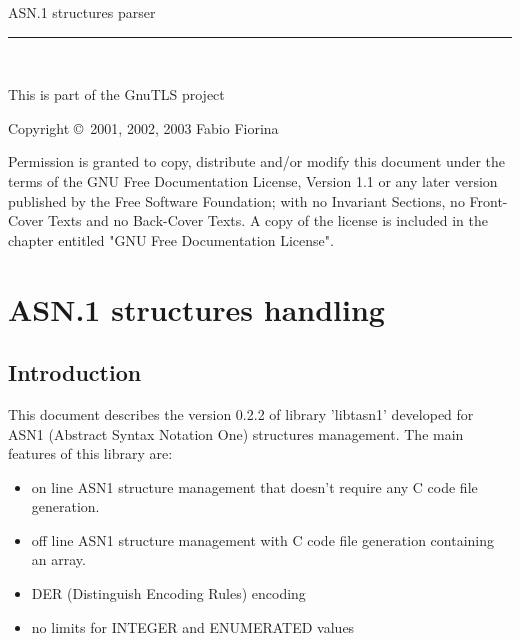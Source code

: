 \documentclass{book}
\newcommand{\HRule}{\rule{\linewidth}{0.4mm}}
\begin{document}
{\Large{ASN.1 structures parser}}
\vspace{-.3cm}
\\
\HRule
\vspace{-.6cm}
\\
\begin{flushright}
This is part of the GnuTLS project\\
\end{flushright}


\begin{center}
\par
Copyright \copyright\ 2001, 2002, 2003  Fabio Fiorina\\
\setlength{\parskip}{4mm}
\par
Permission is granted to copy, distribute and/or modify this
document under the terms of the GNU Free Documentation License,
Version 1.1 or any later version published by the Free Software
Foundation; with no Invariant Sections, no Front-Cover Texts and
no Back-Cover Texts.  A copy of the license is included in the
chapter entitled "GNU Free Documentation License".
\end{center}

\setlength{\parindent}{2mm}

\setlength{\parskip}{1mm}

\tableofcontents

\chapter{ASN.1 structures handling}

\section{Introduction}
 This document describes the version 0.2.2 of library 'libtasn1' developed
for ASN1 (Abstract Syntax Notation One) structures management.
The main features of this library are:
\begin{itemize}
\item on line ASN1 structure management that doesn't require any
C code file generation.
\item off line ASN1 structure management with C code file generation 
containing an array.
\item DER (Distinguish Encoding Rules) encoding
\item no limits for INTEGER and ENUMERATED values  
\end{itemize}
\end{document}

